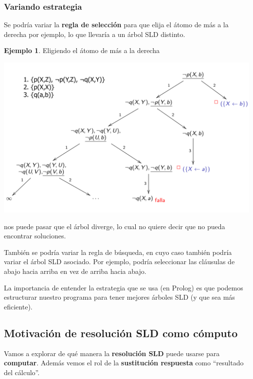 \documentclass{report}
\theoremstyle{definition} %
\newtheorem*{example*}{Ejemplo}
\begin{document}
\subsubsection{Variando estrategia}

Se podría variar la \textbf{regla de selección} para que elija el átomo de más a
la derecha por ejemplo, lo que llevaría a un árbol SLD distinto.

\begin{example*} Eligiendo el átomo de más a la derecha
    \begin{center}
        \includegraphics[scale=0.3]{img/prolog/prolog-sld-right-ex.png}
    \end{center}

    nos puede pasar que el árbol diverge, lo cual no quiere decir que no pueda
    encontrar soluciones.
\end{example*}

También se podría variar la regla de búsqueda, en cuyo caso también podría
variar el árbol SLD asociado. Por ejemplo, podría seleccionar las cláusulas de
abajo hacia arriba en vez de arriba hacia abajo.

La importancia de entender la estrategia que se usa (en Prolog) es que podemos
estructurar nuestro programa para tener mejores árboles SLD (y que sea más
eficiente).

\subsection{Motivación de resolución SLD como cómputo}

Vamos a explorar de qué manera la \textbf{resolución SLD} puede usarse para
\textbf{computar}. Además vemos el rol de la \textbf{sustitución respuesta} como
``resultado del cálculo''.
\end{document}
